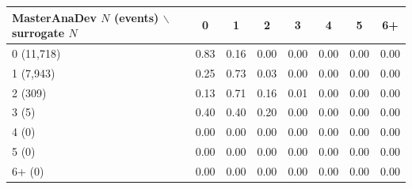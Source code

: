 \begin{tabular}{lccccccc}
\toprule
MasterAnaDev $N$ (events) $\backslash$ surrogate $N$ & 0 & 1 & 2 & 3 & 4 & 5 & 6+ \\
\midrule
0 (11,718) & 0.83 & 0.16 & 0.00 & 0.00 & 0.00 & 0.00 & 0.00 \\
1 (7,943) & 0.25 & 0.73 & 0.03 & 0.00 & 0.00 & 0.00 & 0.00 \\
2 (309) & 0.13 & 0.71 & 0.16 & 0.01 & 0.00 & 0.00 & 0.00 \\
3 (5) & 0.40 & 0.40 & 0.20 & 0.00 & 0.00 & 0.00 & 0.00 \\
4 (0) & 0.00 & 0.00 & 0.00 & 0.00 & 0.00 & 0.00 & 0.00 \\
5 (0) & 0.00 & 0.00 & 0.00 & 0.00 & 0.00 & 0.00 & 0.00 \\
6+ (0) & 0.00 & 0.00 & 0.00 & 0.00 & 0.00 & 0.00 & 0.00 \\
\bottomrule
\end{tabular}
